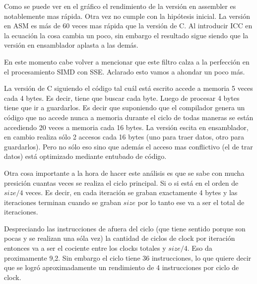 	Como se puede ver en el gráfico el rendimiento de la versión en assembler es notablemente mas rápida. Otra
vez no cumple con la hipótesis inicial. La versión en ASM es más de 60 veces mas rápida que la versión
de C. Al introducir ICC en la ecuación la cosa cambia un poco, sin embargo el resultado sigue siendo que
la versión en ensamblador aplasta a las demás.

	En este momento cabe volver a mencionar que este filtro calza a la perfección en el procesamiento
SIMD con SSE. Aclarado esto vamos a ahondar un poco más.

	La versión de C siguiendo el código tal cuál está escrito accede a memoria 5 veces cada 4 bytes.
Es decir, tiene que buscar cada byte. Luego de procesar 4 bytes tiene que ir a guardarlos. Es decir
que suponiendo que el compilador genera un código que no accede nunca a memoria durante el ciclo de todas
maneras se están accediendo 20 veces a memoria cada 16 bytes. La versión escita en ensamblador, en cambio
realiza sólo 2 accesos cada 16 bytes (uno para traer datos, otro para guardarlos). Pero no sólo eso sino
que además el acceso mas conflictivo (el de trar datos) está optimizado mediante entubado de código.

	Otra cosa importante a la hora de hacer este análisis es que se sabe con mucha presición
cuantas veces se realiza el ciclo principal. Si o si está en el orden de $size/4$ veces. Es decir,
en cada iteración se graban exactamente 4 bytes y las iteraciones terminan cuando se graban $size$
por lo tanto ese va a ser el total de iteraciones.

	Despreciando las instrucciones de afuera del ciclo (que tiene sentido porque son pocas y se
realizan una sóla vez) la cantidad de ciclos de clock por iteración entonces va a ser el cociente
entre los clocks totales y $size/4$. Eso da proximamente 9,2. Sin embargo el ciclo tiene 36
instrucciones, lo que quiere decir que se logró aproximadamente un rendimiento de 4 instrucciones
por ciclo de clock.

	
